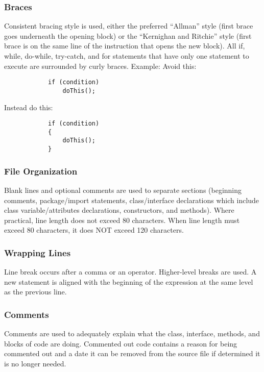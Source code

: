 \subsubsection{Braces}
\begin{itemize}
		Consistent bracing style is used, either the preferred “Allman” style (first brace goes underneath the opening block) or the “Kernighan and Ritchie” style (first brace is on the same line of the instruction that opens the new block).
		All if, while, do-while, try-catch, and for statements that have only one statement to execute are surrounded by curly braces. Example:
		Avoid this:
		\begin{lstlisting}
			if (condition) 
				doThis();
		\end{lstlisting}
		Instead do this:
		\begin{lstlisting}
			if (condition) 
			{
				doThis();
			}
		\end{lstlisting}
\end{itemize}

\subsubsection{File Organization}
\begin{itemize}
		Blank lines and optional comments are used to separate sections (beginning comments, package/import statements, class/interface declarations which include class variable/attributes declarations, constructors, and methods).
		Where practical, line length does not exceed 80 characters.
		When line length must exceed 80 characters, it does NOT exceed 120 characters.
\end{itemize}

\subsubsection{Wrapping Lines}
\begin{itemize}
		Line break occurs after a comma or an operator.
		Higher-level breaks are used.
		A new statement is aligned with the beginning of the expression at the same level as the previous line.
\end{itemize}

\subsubsection{Comments}
\begin{itemize}
		Comments are used to adequately explain what the class, interface, methods, and blocks of code are doing.
		Commented out code contains a reason for being commented out and a date it can be removed from the source file if determined it is no longer needed.
\end{itemize}

